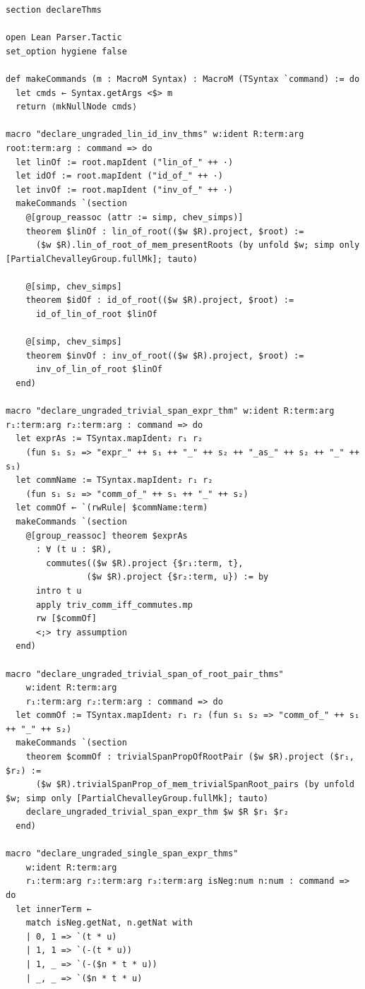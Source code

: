 \documentclass[10pt,a4paper]{article}
\begin{document}
\begin{Verbatim}
section declareThms

open Lean Parser.Tactic
set_option hygiene false

def makeCommands (m : MacroM Syntax) : MacroM (TSyntax `command) := do
  let cmds ← Syntax.getArgs <$> m
  return ⟨mkNullNode cmds⟩

macro "declare_ungraded_lin_id_inv_thms" w:ident R:term:arg root:term:arg : command => do
  let linOf := root.mapIdent ("lin_of_" ++ ·)
  let idOf := root.mapIdent ("id_of_" ++ ·)
  let invOf := root.mapIdent ("inv_of_" ++ ·)
  makeCommands `(section
    @[group_reassoc (attr := simp, chev_simps)]
    theorem $linOf : lin_of_root(($w $R).project, $root) :=
      ($w $R).lin_of_root_of_mem_presentRoots (by unfold $w; simp only [PartialChevalleyGroup.fullMk]; tauto)

    @[simp, chev_simps]
    theorem $idOf : id_of_root(($w $R).project, $root) :=
      id_of_lin_of_root $linOf

    @[simp, chev_simps]
    theorem $invOf : inv_of_root(($w $R).project, $root) :=
      inv_of_lin_of_root $linOf
  end)

macro "declare_ungraded_trivial_span_expr_thm" w:ident R:term:arg r₁:term:arg r₂:term:arg : command => do
  let exprAs := TSyntax.mapIdent₂ r₁ r₂
    (fun s₁ s₂ => "expr_" ++ s₁ ++ "_" ++ s₂ ++ "_as_" ++ s₂ ++ "_" ++ s₁)
  let commName := TSyntax.mapIdent₂ r₁ r₂
    (fun s₁ s₂ => "comm_of_" ++ s₁ ++ "_" ++ s₂)
  let commOf ← `(rwRule| $commName:term)
  makeCommands `(section
    @[group_reassoc] theorem $exprAs
      : ∀ (t u : $R),
        commutes(($w $R).project {$r₁:term, t},
                ($w $R).project {$r₂:term, u}) := by
      intro t u
      apply triv_comm_iff_commutes.mp
      rw [$commOf]
      <;> try assumption
  end)

macro "declare_ungraded_trivial_span_of_root_pair_thms"
    w:ident R:term:arg
    r₁:term:arg r₂:term:arg : command => do
  let commOf := TSyntax.mapIdent₂ r₁ r₂ (fun s₁ s₂ => "comm_of_" ++ s₁ ++ "_" ++ s₂)
  makeCommands `(section
    theorem $commOf : trivialSpanPropOfRootPair ($w $R).project ($r₁, $r₂) :=
      ($w $R).trivialSpanProp_of_mem_trivialSpanRoot_pairs (by unfold $w; simp only [PartialChevalleyGroup.fullMk]; tauto)
    declare_ungraded_trivial_span_expr_thm $w $R $r₁ $r₂
  end)

macro "declare_ungraded_single_span_expr_thms"
    w:ident R:term:arg
    r₁:term:arg r₂:term:arg r₃:term:arg isNeg:num n:num : command => do
  let innerTerm ←
    match isNeg.getNat, n.getNat with
    | 0, 1 => `(t * u)
    | 1, 1 => `(-(t * u))
    | 1, _ => `(-($n * t * u))
    | _, _ => `($n * t * u)


\end{Verbatim}
\end{document}
